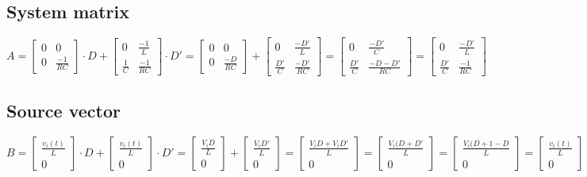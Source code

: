 \subsection{System matrix}
\[
	A
	=
	\begin{bmatrix}
		0 & 0 \\
		0 & \frac{-1}{R C}
	\end{bmatrix}
	\cdot D
	+
	\begin{bmatrix}
		0 		& \frac{-1}{L} \\
		\frac{1}{C} 	& \frac{-1}{R C}
	\end{bmatrix}
	\cdot D'
	=
	\begin{bmatrix}
		0		& 0 \\
		0		& \frac{-D}{R C}
	\end{bmatrix}
	+
	\begin{bmatrix}
		0		& \frac{-D'}{L} \\
		\frac{D'}{C}	& \frac{-D'}{R C}
	\end{bmatrix}
	=
	\begin{bmatrix}
		0		& \frac{-D'}{C} \\
		\frac{D'}{C}	& \frac{-D-D'}{R C}
	\end{bmatrix}
	=
	\begin{bmatrix}
		0		& \frac{-D'}{L} \\
		\frac{D'}{C}	& \frac{-1}{R C}
	\end{bmatrix}
\]

\subsection{Source vector}
\[
	B
	= 
	\begin{bmatrix}
		\frac{v_i(t)}{L} \\
		0
	\end{bmatrix}
	\cdot D
	+
	\begin{bmatrix}
		\frac{v_i(t)}{L} \\
		0
	\end{bmatrix}
	\cdot D'
	=
	\begin{bmatrix}
		\frac{V_i D}{L} \\
		0
	\end{bmatrix}
	+
	\begin{bmatrix}
		\frac{V_i D'}{L} \\
		0
	\end{bmatrix}
	=
	\begin{bmatrix}
		\frac{V_i D + V_i D'}{L} \\
		0
	\end{bmatrix}
	=
	\begin{bmatrix}
		\frac{V_i(D+D'}{L} \\
		0
	\end{bmatrix}
	=
	\begin{bmatrix}
		\frac{V_i(D + 1 - D}{L} \\
		0
	\end{bmatrix}
	=
	\begin{bmatrix}
		\frac{v_i(t)}{L} \\
		0
	\end{bmatrix}
\]

